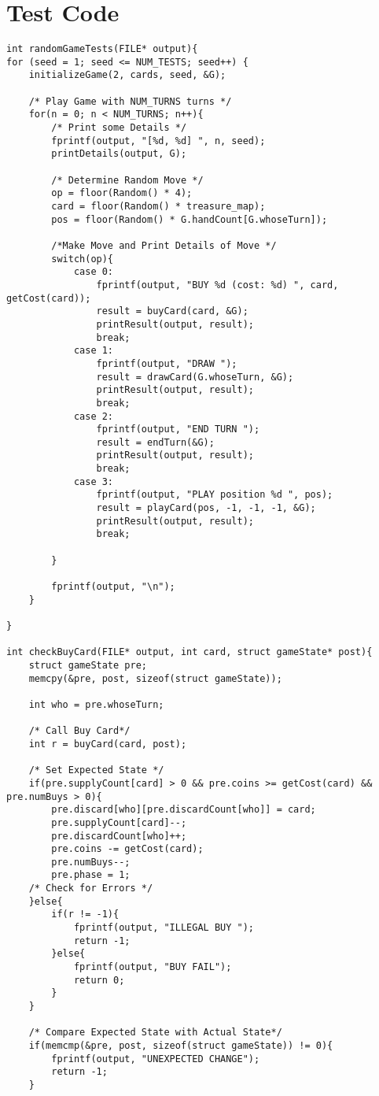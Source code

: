 \documentclass[letterpaper,12pt]{article}
\begin{document}
\section{Test Code}
\begin{verbatim}
int randomGameTests(FILE* output){
for (seed = 1; seed <= NUM_TESTS; seed++) {
	initializeGame(2, cards, seed, &G);

	/* Play Game with NUM_TURNS turns */
	for(n = 0; n < NUM_TURNS; n++){
		/* Print some Details */
		fprintf(output, "[%d, %d] ", n, seed);
		printDetails(output, G);
		
		/* Determine Random Move */
		op = floor(Random() * 4);
		card = floor(Random() * treasure_map);
		pos = floor(Random() * G.handCount[G.whoseTurn]);
		
		/*Make Move and Print Details of Move */
		switch(op){
			case 0:
				fprintf(output, "BUY %d (cost: %d) ", card, getCost(card));
				result = buyCard(card, &G);
				printResult(output, result);
				break;
			case 1:
				fprintf(output, "DRAW ");
				result = drawCard(G.whoseTurn, &G);
				printResult(output, result);
				break;
			case 2:
				fprintf(output, "END TURN ");
				result = endTurn(&G);
				printResult(output, result);
				break;
			case 3:
				fprintf(output, "PLAY position %d ", pos);
				result = playCard(pos, -1, -1, -1, &G);
				printResult(output, result);
				break;
				
		}
		
		fprintf(output, "\n");
	}
	
}

int checkBuyCard(FILE* output, int card, struct gameState* post){
	struct gameState pre;
	memcpy(&pre, post, sizeof(struct gameState));
	
	int who = pre.whoseTurn;
	
	/* Call Buy Card*/
	int r = buyCard(card, post);
	
	/* Set Expected State */
	if(pre.supplyCount[card] > 0 && pre.coins >= getCost(card) && pre.numBuys > 0){
		pre.discard[who][pre.discardCount[who]] = card;
		pre.supplyCount[card]--;
		pre.discardCount[who]++;
		pre.coins -= getCost(card);
		pre.numBuys--;
		pre.phase = 1;
	/* Check for Errors */
	}else{
		if(r != -1){
			fprintf(output, "ILLEGAL BUY ");
			return -1;
		}else{
			fprintf(output, "BUY FAIL");
			return 0;
		}
	}
	
	/* Compare Expected State with Actual State*/
	if(memcmp(&pre, post, sizeof(struct gameState)) != 0){
		fprintf(output, "UNEXPECTED CHANGE");
		return -1;
	}
	

\end{verbatim}
\end{document}
